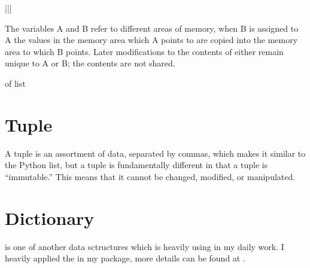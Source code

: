 \documentclass[letterpaper,12pt,english]{sphinxmanual}
\def\X{\mathbf{X}}
\begin{document}
\begin{savenotes}
\begin{tabular}[t]{|*{2}{\X{1}{2}|}}
\begin{footnote}[1]
\begin{quote}
\begin{sphinxfigure-in-table}
\noindent{}
\end{sphinxfigure-in-table}\relax
\end{quote}

The variables A and B refer to different areas of memory, when B is assigned to A the values in the memory area which A points to are copied into the memory area to which B points. Later modifications to the contents of either remain unique to A or B; the contents are not shared.
%
\end{footnote} of list
\\
\hline
\end{tabular}
\par
\sphinxattableend\end{savenotes}


\section{Tuple}
\label{\detokenize{struct:tuple}}
A tuple is an assortment of data, separated by commas, which makes it similar to the Python list, but a tuple is fundamentally different in that a tuple is “immutable.” This means that it cannot be changed, modified, or manipulated.


\section{Dictionary}
\label{\detokenize{struct:dictionary}}
 is one of another data sctructures which is heavily using in my daily work. I heavily applied the  in my  package, more details can be found at .
\end{document}
